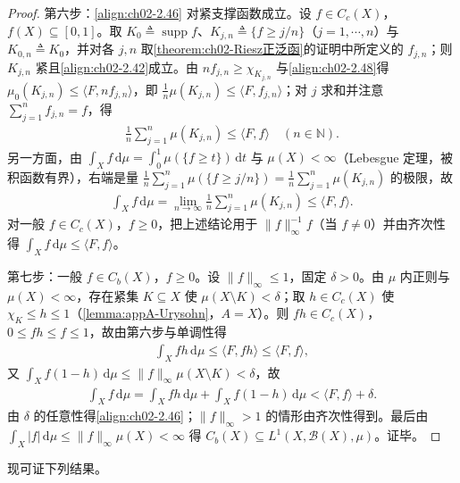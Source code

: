 \documentclass[../../main.tex]{subfiles}%
\begin{document}
\begin{proof}
第六步：\eqref{align:ch02-2.46} 对紧支撑函数成立。设 $f\in C_c(X)$，$f(X)\subseteq[0,1]$。取 $K_0\triangleq\operatorname{supp}f$、$K_{j,n}\triangleq\{f\geqslant j/n\}$（$j=1,\cdots,n$）与 $K_{0,n}\triangleq K_0$，并对各 $j,n$ 取\cref{theorem:ch02-Riesz正泛函}的证明中所定义的 $f_{j,n}$；则 $K_{j,n}$ 紧且\eqref{align:ch02-2.42}成立。由 $nf_{j,n}\geqslant\chi_{K_{j,n}}$ 与\eqref{align:ch02-2.48}得 $\mu_0(K_{j,n})\leqslant\langle F,nf_{j,n}\rangle$，即 $\frac1n\mu(K_{j,n})\leqslant\langle F,f_{j,n}\rangle$；对 $j$ 求和并注意 $\sum_{j=1}^nf_{j,n}=f$，得
\begin{align*}
\frac1n\sum_{j=1}^n\mu(K_{j,n})\leqslant\langle F,f\rangle\quad(n\in\mathbb N).
\end{align*}
另一方面，由 $\int_Xf\,\mathrm{d}\mu=\int_0^1\mu(\{f\geqslant t\})\,\mathrm{d}t$ 与 $\mu(X)<\infty$（Lebesgue 定理，被积函数有界），右端是量 $\frac1n\sum_{j=1}^n\mu(\{f\geqslant j/n\})=\frac1n\sum_{j=1}^n\mu(K_{j,n})$ 的极限，故
\begin{align*}
\int_Xf\,\mathrm{d}\mu=\lim_{n\to\infty}\frac1n\sum_{j=1}^n\mu(K_{j,n})\leqslant\langle F,f\rangle.
\end{align*}
对一般 $f\in C_c(X)$，$f\geqslant0$，把上述结论用于 $\|f\|_\infty^{-1}f$（当 $f\neq0$）并由齐次性得 $\int_Xf\,\mathrm{d}\mu\leqslant\langle F,f\rangle$。

第七步：一般 $f\in C_b(X)$，$f\geqslant0$。设 $\|f\|_\infty\leqslant1$，固定 $\delta>0$。由 $\mu$ 内正则与 $\mu(X)<\infty$，存在紧集 $K\subseteq X$ 使 $\mu(X\setminus K)<\delta$；取 $h\in C_c(X)$ 使 $\chi_K\leqslant h\leqslant1$（\cref{lemma:appA-Urysohn}，$A=X$）。则 $fh\in C_c(X)$，$0\leqslant fh\leqslant f\leqslant1$，故由第六步与单调性得
\begin{align*}
\int_Xfh\,\mathrm{d}\mu\leqslant\langle F,fh\rangle\leqslant\langle F,f\rangle,
\end{align*}
又 $\int_Xf(1-h)\,\mathrm{d}\mu\leqslant\|f\|_\infty\mu(X\setminus K)<\delta$，故
\begin{align*}
\int_Xf\,\mathrm{d}\mu=\int_Xfh\,\mathrm{d}\mu+\int_Xf(1-h)\,\mathrm{d}\mu<\langle F,f\rangle+\delta.
\end{align*}
由 $\delta$ 的任意性得\eqref{align:ch02-2.46}；$\|f\|_\infty>1$ 的情形由齐次性得到。最后由 $\int_X|f|\,\mathrm{d}\mu\leqslant\|f\|_\infty\mu(X)<\infty$ 得 $C_b(X)\subseteq L^1(X,\mathscr B(X),\mu)$。证毕。
\end{proof}

现可证下列结果。
\end{document}
